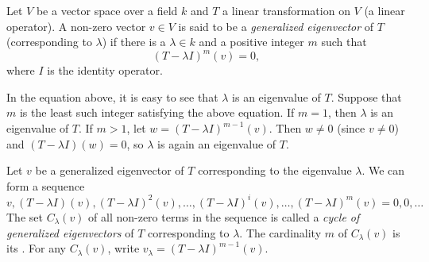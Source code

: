 \documentclass[12pt]{article}
\begin{document}
Let $V$ be a vector space over a field $k$ and $T$ a linear transformation on $V$ (a linear operator).  A non-zero vector $v\in V$ is said to be a \emph{generalized eigenvector} of $T$ (corresponding to $\lambda$) if there is a $\lambda\in k$ and a positive integer $m$ such that $$(T-\lambda I)^m(v)=0,$$
where $I$ is the identity operator.

In the equation above, it is easy to see that $\lambda$ is an eigenvalue of $T$.  Suppose that $m$ is the least such integer satisfying the above equation.  If $m=1$, then $\lambda$ is an eigenvalue of $T$.  If $m>1$, let $w=(T-\lambda I)^{m-1}(v)$.  Then $w\ne 0$ (since $v\ne 0$) and $(T-\lambda I)(w)=0$, so $\lambda$ is again an eigenvalue of $T$.

Let $v$ be a generalized eigenvector of $T$ corresponding to the eigenvalue $\lambda$.  We can form a sequence $$v, (T-\lambda I)(v), (T-\lambda I)^2(v), \ldots, (T-\lambda I)^i(v), \ldots, (T-\lambda I)^m(v)=0, 0, \ldots$$
The set $C_{\lambda}(v)$ of all non-zero terms in the sequence is called a \emph{cycle of generalized eigenvectors} of $T$ corresponding to $\lambda$.  The cardinality $m$ of $C_{\lambda}(v)$ is its .  For any $C_{\lambda}(v)$, write $v_{\lambda}=(T-\lambda I)^{m-1}(v)$.
\end{document}
